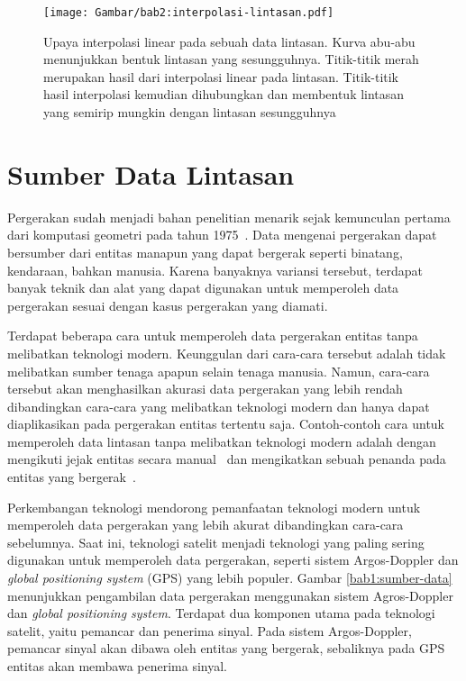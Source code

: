 \begin{figure}[h]
    \centering
    \captionsetup{width=0.7\textwidth}
    \texttt{[image: Gambar/bab2:interpolasi-lintasan.pdf]}
    \caption[Interpolasi lintasan]{Upaya interpolasi linear pada sebuah data lintasan. Kurva abu-abu menunjukkan bentuk lintasan yang sesungguhnya. Titik-titik merah merupakan hasil dari interpolasi linear pada lintasan. Titik-titik hasil interpolasi kemudian dihubungkan dan membentuk lintasan yang semirip mungkin dengan lintasan sesungguhnya}
    \label{bab2:interpolasi-lintasan}
\end{figure}

\section{Sumber Data Lintasan}
\label{sec:sumber}

Pergerakan sudah menjadi bahan penelitian menarik sejak kemunculan pertama dari komputasi geometri pada tahun 1975~\cite{shamos:02:computational-geometry}. Data mengenai pergerakan dapat bersumber dari entitas manapun yang dapat bergerak seperti binatang, kendaraan, bahkan manusia. Karena banyaknya variansi tersebut, terdapat banyak teknik dan alat yang dapat digunakan untuk memperoleh data pergerakan sesuai dengan kasus pergerakan yang diamati.

Terdapat beberapa cara untuk memperoleh data pergerakan entitas tanpa melibatkan teknologi modern. Keunggulan dari cara-cara tersebut adalah tidak melibatkan sumber tenaga apapun selain tenaga manusia. Namun, cara-cara tersebut akan menghasilkan akurasi data pergerakan yang lebih rendah dibandingkan cara-cara yang melibatkan teknologi modern dan hanya dapat diaplikasikan pada pergerakan entitas tertentu saja. Contoh-contoh cara untuk memperoleh data lintasan tanpa melibatkan teknologi modern adalah dengan mengikuti jejak entitas secara manual~\cite{stickel:02:turtle} dan mengikatkan sebuah penanda pada entitas yang bergerak~\cite{velden:02:cranes}.

Perkembangan teknologi mendorong pemanfaatan teknologi modern untuk memperoleh data pergerakan yang lebih akurat dibandingkan cara-cara sebelumnya. Saat ini, teknologi satelit menjadi teknologi yang paling sering digunakan untuk memperoleh data pergerakan, seperti sistem Argos-Doppler dan \textit{global positioning system} (GPS) yang lebih populer. Gambar \ref{bab1:sumber-data} menunjukkan pengambilan data pergerakan menggunakan sistem Agros-Doppler dan \textit{global positioning system}. Terdapat dua komponen utama pada teknologi satelit, yaitu pemancar dan penerima sinyal. Pada sistem Argos-Doppler, pemancar sinyal akan dibawa oleh entitas yang bergerak, sebaliknya pada GPS entitas akan membawa penerima sinyal.

